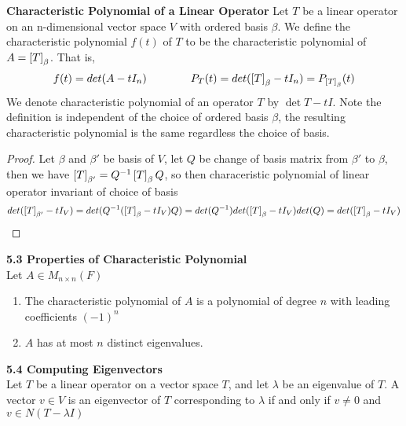 \documentclass[11pt]{article}
\begin{document}
\begin{defn*}
    \textbf{Characteristic Polynomial of a Linear Operator} Let $T$ be a linear operator on an n-dimensional vector space $V$ with ordered basis $\beta$. We define the characteristic polynomial $f(t)$ of $T$ to be the characteristic polynomial of $A = \left[ T \right]_{\beta}$. That is,
    \[  
        f(t) = det(A - tI_n)    
        \quad \quad \quad \quad 
        P_{T}(t) = det(\left[ T \right]_{\beta} - tI_n) = P_{\left[ T \right]_{\beta}}(t)
    \]
    We denote characteristic polynomial of an operator $T$ by $\det{T - tI}$. Note the definition is independent of the choice of ordered basis $\beta$, the resulting characteristic polynomial is the same regardless the choice of basis.
    \begin{proof}
        Let $\beta$ and $\beta'$ be basis of $V$, let $Q$ be change of basis matrix from $\beta'$ to $\beta$, then we have $\left[ T \right]_{\beta'} = Q^{-1}\left[ T \right]_{\beta}Q$, so then characeristic polynomial of linear operator invariant of choice of basis
        \[
            det(\left[ T \right]_{\beta'} - tI_V) 
            = det(Q^{-1}(\left[ T \right]_{\beta} - tI_V)Q) 
            = det(Q^{-1}) det(\left[ T \right]_{\beta} - tI_V) det(Q)
            = det(\left[ T \right]_{\beta} - tI_V)
        \]
    \end{proof}
\end{defn*}

\begin{theorem*}
    \textbf{5.3 Properties of Characteristic Polynomial} \\
    Let $A\in M_{n\times n}(F)$
    \begin{enumerate}
        \item The characteristic polynomial of $A$ is a polynomial of degree $n$ with leading coefficients $(-1)^n$
        \item $A$ has at most $n$ distinct eigenvalues. 
    \end{enumerate}
\end{theorem*}

\begin{theorem*}
    \textbf{5.4 Computing Eigenvectors} \\
    Let $T$ be a linear operator on a vector space $T$, and let $\lambda$ be an eigenvalue of $T$. A vector $v\in V$ is an eigenvector of $T$ corresponding to $\lambda$ if and only if $v\neq 0$ and $v\in N(T-\lambda I)$
\end{theorem*}
\end{document}
